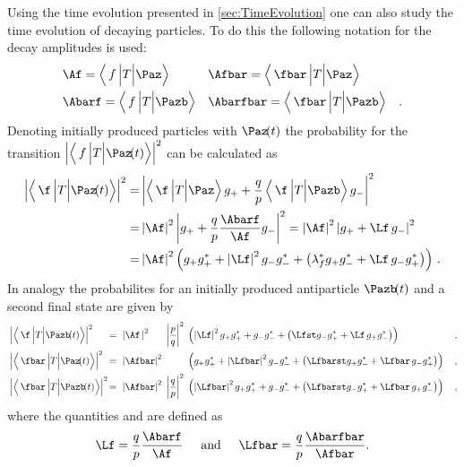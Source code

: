 Using the time evolution presented in \cref{sec:TimeEvolution} one can also study the time evolution of decaying particles.
To do this the following notation for the decay amplitudes is used:
\begin{equation}
\begin{aligned}
&\Af = \left<\,f\,\Big|T\Big|\Paz\right>&&\Afbar = \left<\,\fbar\,\Big|T\Big|\Paz\right>&\\
&\Abarf = \left<\,f\,\Big|T\Big|\Pazb\right>&&\Abarfbar = \left<\,\fbar\,\Big|T\Big|\Pazb\right>&.
\end{aligned}
\end{equation}
Denoting initially produced particles with $\Paz\!(t)$ the probability for the transition $\left|\left<\,f\,\Big|T\Big|\Paz\!(t)\right>\right|^2$ can be calculated as
\begin{align}
\left|\left<\,\f\,\Big|T\Big|\Paz\!(t)\right>\right|^2 =&
\left|\left<\,\f\,\Big|T\Big|\Paz\right>g_++\frac{q}{p}\left<\,\f\,\Big|T\Big|\Pazb\right>g_-\right|^2\nonumber\\
=&\left|\Af\right|^2\left|g_+ + \frac{q}{p}\frac{\Abarf}{\Af} g_-\right|^2=\left|\Af\right|^2\left|g_+ +\Lf\,g_-\right|^2\nonumber\\
=&\left|\Af\right|^2\left(g_+g_+^*+\left|\Lf\right|^2g_-g_-^*+\left(\lambda_{f}^*g_+g_-^* + \Lf\, g_-g_+^*\right)\right)\,.
\end{align}
In analogy the probabilites for an initially produced antiparticle $\Pazb\!(t)$ and a second final state \fbar are given by
\begin{align}
&\left|\left<\,\f\,\Big|T\Big|\Pazb\!(t)\right>\right|^2&\kern -8.5pt{=}
&\kern 6.0pt{\left|\Af\,\right|^2}&&\kern -5.5pt{\left|\frac{p}{q}\right|^2}& &\kern -5.5pt{\left(\left|\Lf\right|^2g_+g_+^*+g_-g_-^*+\left(\Lfst g_-g_+^* + \Lf\, g_+g_-^*\right)\right)}&\,,\\
&\left|\left<\,\fbar\,\Big|T\Big|\Paz\!(t)\right>\right|^2&\kern -8.5pt{=}
&\kern 6.0pt{\left|\Afbar\right|^2}& && &\kern -5.5pt{\left(g_+g_+^*+\left|\Lfbar\right|^2g_-g_-^*+\left(\Lfbarst g_+g_-^* + \Lfbar\, g_-g_+^*\right)\right)}&\,,\\
&\left|\left<\,\fbar\,\Big|T\Big|\Pazb\!(t)\right>\right|^2&\kern -8.5pt{=}
&\kern 6.0pt{\left|\Afbar\right|^2}& &\kern -5.5pt{\left|\frac{q}{p}\right|^2}& &\kern -5.5pt{\left(\left|\Lfbar\right|^2g_+g_+^*+g_-g_-^*+\left(\Lfbarst g_-g_+^* + \Lfbar\, g_+g_-^*\right)\right)}&\,,
\end{align}
where the quantities \Lf and \Lfbar are defined as
\begin{equation}
\Lf=\frac{q}{p}\frac{\Abarf}{\Af}\hspace{0.5cm}\text{and}
\hspace{0.5cm}\Lfbar=\frac{q}{p}\frac{\Abarfbar}{\Afbar}.\label{eq:defLambdas}
\end{equation}
